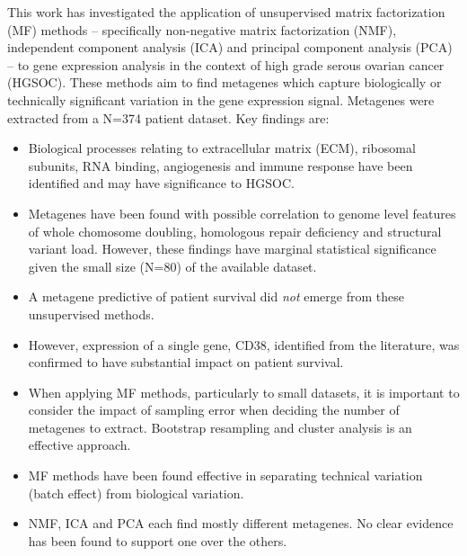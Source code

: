 \documentclass[tikz, 11pt,a4paper,oneside,fleqn, draft]{article}
\begin{document}
This work has investigated the application of unsupervised matrix factorization (MF) methods  -- specifically non-negative matrix factorization (NMF), independent component analysis (ICA) and principal component analysis (PCA) -- to gene expression analysis in the context of high grade serous ovarian cancer (HGSOC).  These methods aim to find metagenes which capture biologically or technically significant variation in the gene expression signal.  Metagenes were extracted from a N=374 patient dataset. Key findings are:
\begin{itemize}
\item
Biological processes relating to  extracellular matrix (ECM), ribosomal subunits, RNA binding, angiogenesis and immune response have been identified and may have significance to HGSOC.
\item
Metagenes have been found with possible correlation to genome level features of whole chomosome doubling, homologous repair deficiency and structural variant load.  However, these findings have marginal statistical significance given the small size (N=80) of the available dataset.
\item
A metagene predictive of patient survival did \emph{not} emerge from these unsupervised methods.
\item
However, expression of a single gene, CD38, identified from the literature, was confirmed to have substantial impact on patient survival.
\item
When applying MF methods, particularly to small datasets, it is important to consider the impact of sampling error when deciding the number of metagenes to extract.  Bootstrap resampling and cluster analysis is an effective approach.
\item
MF methods have been found effective in separating technical variation (batch effect) from biological variation.
\item
NMF, ICA and PCA each find mostly different metagenes. No clear evidence has been found to support one over the others.

\end{itemize}




\normalsize
\end{document}
